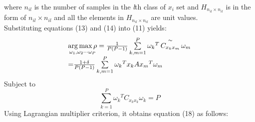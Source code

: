 \documentclass[journal]{IEEEtran}
\begin{document}
where ${n_{il}}$ is the number of samples in the \emph{l}th class of ${x_i}$ set and ${H_{{n_{i{l}}} \times {n_{il}}}}$ is in the form of ${n_{il}} \times {n_{il}}$ and all the elements in ${H_{{n_{i{l}}} \times {n_{il}}}}$ are unit values.\\
Substituting equations (13) and (14) into (11) yields:
\begin{equation} \begin{array}{l}
\mathop {\arg \max \rho }\limits_{{\omega _1},{\omega _2} \cdots {\omega _P}}  = \frac{1}{{P(P - 1)}}\sum\limits_{k,m = 1}^P {{\omega _k}^T\mathop {{C_{{x_k}{x_m}}}}\limits^ \sim  {\omega _m}} {\rm{  }}\\
{\rm{ = }}\frac{{1 + \delta }}{{P(P - 1)}}\sum\limits_{k,m = 1}^P {{\omega _k}^T{x_k}A{x_m}^T{\omega _m}}
\end{array} \end{equation}
Subject to
\begin{equation} \sum\limits_{k = 1}^P {{\omega _k}^T{C_{{x_k}{x_k}}}{\omega _k}}  = P \end{equation}
Using Lagrangian multiplier criterion, it obtains equation (18) as follows:
\end{document}
